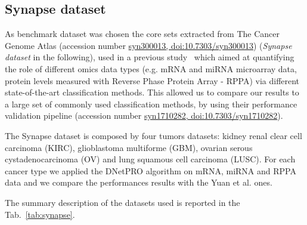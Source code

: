 \documentclass{standalone}
\begin{document}
\subsection[Synapse]{Synapse dataset}\label{synapse:synapse}

As benchmark dataset was chosen the core sets extracted from The Cancer Genome Atlas (accession number \href{https://www.synapse.org/#!Synapse:syn300013/wiki/27406}{syn300013, doi:10.7303/syn300013}) (\emph{Synapse dataset} in the following), used in a previous study~\cite{Yuan2014} which aimed at quantifying the role of different omics data types (e.g. mRNA and miRNA microarray data, protein levels measured with Reverse Phase Protein Array - RPPA) via different state-of-the-art classification methods.
This allowed us to compare our results to a large set of commonly used classification methods, by using their performance validation pipeline (accession number \href{https://www.synapse.org/#!Synapse:syn1710282/wiki/27303}{syn1710282, doi:10.7303/syn1710282}).

The Synapse dataset is composed by four tumors datasets: kidney renal clear cell carcinoma (KIRC), glioblastoma multiforme (GBM), ovarian serous cystadenocarcinoma (OV) and lung squamous cell carcinoma (LUSC).
For each cancer type we applied the \textsf{DNetPRO} algorithm on mRNA, miRNA and RPPA data and we compare the performances results with the Yuan et al. ones.

The summary description of the datasets used is reported in the Tab.~\ref{tab:synapse}.
\end{document}
